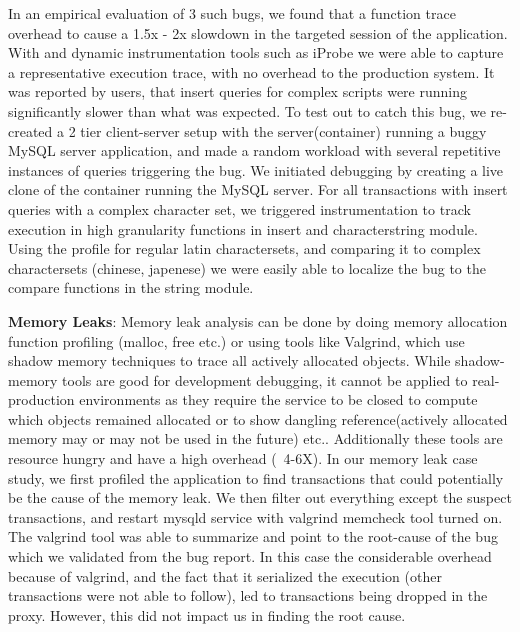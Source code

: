 In an empirical evaluation of 3 such bugs, we found that a function trace overhead to cause a 1.5x - 2x slowdown in the targeted session of the application. 
With \parikshan and dynamic instrumentation tools such as iProbe\cite{iProbe} we were able to capture a representative execution trace, with no overhead to the production system.
It was reported by users, that insert queries for complex scripts were running significantly slower than what was expected.
To test out \parikshan to catch this bug, we re-created a 2 tier client-server setup with the server(container) running a buggy MySQL server application, and made a random workload with several repetitive instances of queries triggering the bug.
We initiated debugging by creating a live clone of the container running the MySQL server.
For all transactions with insert queries with a complex character set, we triggered instrumentation to track execution in high granularity functions in insert and character\/string module.
Using the profile for regular latin charactersets, and comparing it to complex charactersets (chinese, japenese) we were easily able to localize the bug to the compare functions in the string module.



\textbf{Memory Leaks}: %
Memory leak analysis can be done by doing memory allocation function profiling (malloc, free etc.) or using tools like Valgrind\cite{valgrind}, which use shadow memory techniques to trace all actively allocated objects.
While shadow-memory tools are good for development debugging, it cannot be applied to real-production environments as they require the service to be closed to compute which objects remained allocated or to show dangling reference(actively allocated memory may or may not be used in the future) etc.. Additionally these tools are resource hungry and have a high overhead (~4-6X).
In our memory leak case study, we first profiled the application to find transactions that could potentially be the cause of the memory leak. 
We then filter out everything except the suspect transactions, and restart mysqld service with valgrind memcheck tool turned on.
The valgrind tool was able to summarize and point to the root-cause of the bug which we validated from the bug report.
In this case the considerable overhead because of valgrind, and the fact that it serialized the execution (other transactions were not able to follow), led to transactions being dropped in the proxy. 
However, this did not impact us in finding the root cause.

